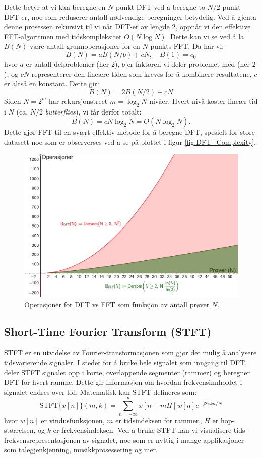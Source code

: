 \noindent
Dette betyr at vi kan beregne en $N$-punkt DFT ved å beregne to $N/2$-punkt DFT-er, noe som reduserer antall nødvendige beregninger betydelig. Ved å gjenta denne prosessen rekursivt til vi når DFT-er av lengde 2, oppnår vi den effektive FFT-algoritmen med tidskompleksitet $O(N \log N)$. Dette kan vi se ved å la $B(N)$ være antall grunnoperasjoner for en $N$-punkts FFT. Da har vi:
\[
    B(N) = aB(N/b) + cN, \quad B(1) = c_0
\]
hvor $a$ er antall delproblemer (her $2$), $b$ er faktoren vi deler problemet med (her $2$), og $cN$ representerer den lineære tiden som kreves for å kombinere resultatene, $c$ er altså en konstant. Dette gir:
\[
    B(N) = 2B(N/2) + cN
\]
Siden $N=2^m$ har rekursjonstreet $m=\log_2 N$ nivåer. Hvert nivå koster lineær tid i $N$ (ca. $N/2$ \emph{butterflies}), vi får derfor totalt:
\[
    B(N)=cN\log_2 N=O(N\log_2 N).
\]
Dette gjør FFT til en svært effektiv metode for å beregne DFT, spesielt for store datasett noe som er observerses ved å se på plottet i figur \ref{fig:DFT_Complexity}.
\begin{figure}[h]
    \centering
    \includegraphics[width=.9\textwidth]{./Media/DFT_Complexity_VS_FFT.png}
    \caption{Operasjoner for DFT vs FFT som funksjon av antall prøver $N$.}
    \label{fig:FFT_Complexity}
\end{figure}
\clearpage 
\noindent
\subsection{Short-Time Fourier Transform (STFT)}
STFT er en utvidelse av Fourier-transformasjonen som gjør det mulig å analysere tidsvarierende signaler. I stedet for å bruke hele signalet som inngang til DFT, deler STFT signalet opp i korte, overlappende segmenter (rammer) og beregner DFT for hvert ramme. Dette gir informasjon om hvordan frekvensinnholdet i signalet endres over tid. Matematisk kan STFT defineres som:
\[
    \text{STFT}\{x[n]\}(m, k) = \sum_{n=-\infty}^{\infty} x[n+mH] w[n] e^{-\jj 2 \pi k n / N}
\]
hvor \(w[n]\) er vindusfunksjonen, \(m\) er tidsindeksen for rammen, \(H\) er hop-størrelsen, og \(k\) er frekvensindeksen. Ved å bruke STFT kan vi visualisere tids-frekvensrepresentasjonen av signalet, noe som er nyttig i mange applikasjoner som talegjenkjenning, musikkprosessering og mer.

